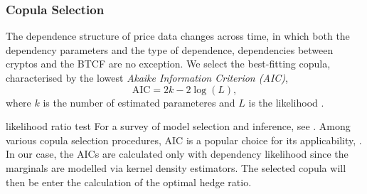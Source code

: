 
\subsubsection{Copula Selection}\label{subsec:copula-selection}



The dependence structure of price data changes across time, in which
both the dependency parameters and the type of dependence,
dependencies between cryptos and the BTCF are no exception. \natp{\em [?]}
We select the best-fitting copula, characterised by the lowest {\em Akaike Information Criterion (AIC)},
\begin{equation*}
 \text{AIC} = 2k- 2 \log(L),
\end{equation*}
where $k$ is the number of estimated
parameteres and $L$ is the likelihood \citep{Akaike1973}. 

 likelihood ratio test 
For a survey of model selection and inference, see \cite{anderson1998comparison}.
Among various copula selection procedures, AIC is a popular choice for
its applicability, .
In our case, the AICs are calculated only with dependency likelihood
since the marginals are modelled via kernel density estimators.
The selected copula will then be enter the calculation of the optimal
hedge ratio.


